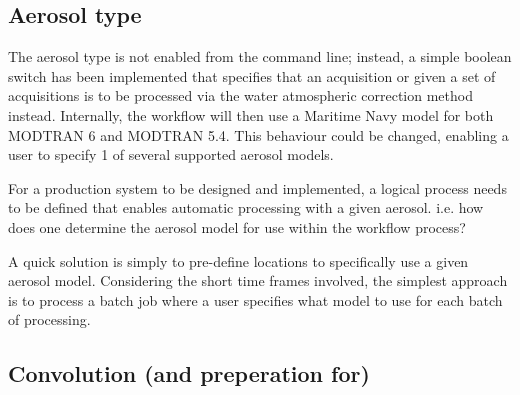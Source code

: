 \documentclass[a4paper]{article}
\begin{document}
  \subsection{Aerosol type}
    \begin{flushleft}
      The aerosol type is not enabled from the command line; instead, a simple boolean switch has been implemented that specifies that an acquisition or given a set of acquisitions is to be processed via the water atmospheric correction method instead. Internally, the workflow will then use a Maritime Navy model for both MODTRAN 6 and MODTRAN 5.4. This behaviour could be changed, enabling a user to specify 1 of several supported aerosol models. \par
      For a production system to be designed and implemented, a logical process needs to be defined that enables automatic processing with a given aerosol. i.e. how does one determine the aerosol model for use within the workflow process? \par
      A quick solution is simply to pre-define locations to specifically use a given aerosol model. Considering the short time frames involved, the simplest approach is to process a batch job where a user specifies what model to use for each batch of processing.
    \end{flushleft}

  \subsection{Convolution (and preperation for)}
\end{document}
